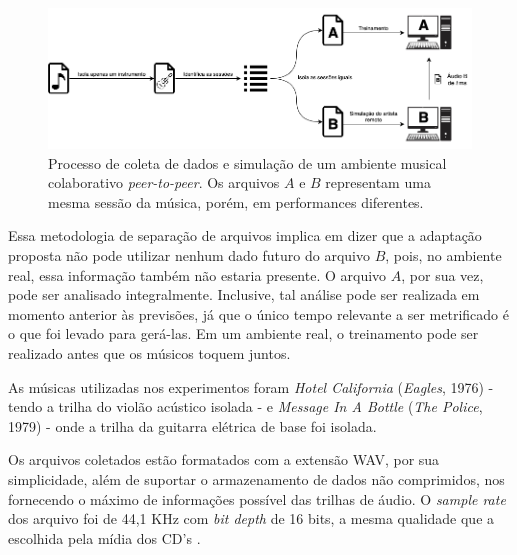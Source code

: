 \begin{figure}[htbp]
\centering
\includegraphics[width=1\textwidth]{images/data-gathering.png}
\caption{Processo de coleta de dados e simulação de um ambiente musical colaborativo \textit{peer-to-peer}. Os arquivos $A$ e $B$ representam uma mesma sessão da música, porém, em performances diferentes.}
\label{fig:data_gathering}
\end{figure}

Essa metodologia de separação de arquivos implica em dizer que a adaptação proposta não pode utilizar nenhum dado futuro do arquivo $B$, pois, no ambiente real, essa informação também não estaria presente. O arquivo $A$, por sua vez, pode ser analisado integralmente. Inclusive, tal análise pode ser realizada em momento anterior às previsões, já que o único tempo relevante a ser metrificado é o que foi levado para gerá-las. Em um ambiente real, o treinamento pode ser realizado antes que os músicos toquem juntos.

As músicas utilizadas nos experimentos foram \textit{Hotel California} (\textit{Eagles}, 1976) - tendo a trilha do violão acústico isolada - e \textit{Message In A Bottle} (\textit{The Police}, 1979) - onde a trilha da guitarra elétrica de base foi isolada.

Os arquivos coletados estão formatados com a extensão WAV, por sua simplicidade, além de suportar o armazenamento de dados não comprimidos, nos fornecendo o máximo de informações possível das trilhas de áudio. O \textit{sample rate} dos arquivo foi de 44,1 KHz com \textit{bit depth} de 16 bits, a mesma qualidade que a escolhida pela mídia dos CD's \cite{cd_quality}.
